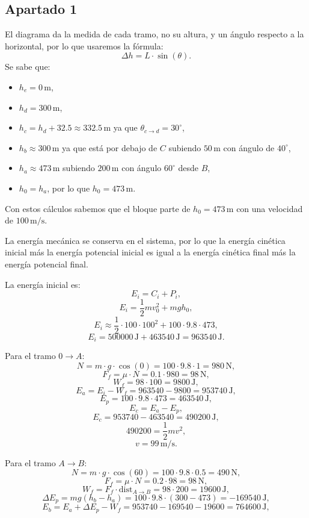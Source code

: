 \documentclass[a4paper,12pt]{article} %
\begin{document}
\subsection*{Apartado 1}
El diagrama da la medida de cada tramo, no su altura, y un ángulo respecto a la horizontal, por lo que usaremos la fórmula:
\[
\Delta h = L \cdot \sin(\theta).
\]
Se sabe que:
\begin{itemize}
    \item $h_e = 0\,\mathrm{m}$,
    \item $h_d = 300\,\mathrm{m}$,
    \item $h_c = h_d + 32.5 \approx 332.5\,\mathrm{m}$ ya que $\theta_{c \to d} = 30^\circ$,
    \item $h_b \approx 300\,\mathrm{m}$ ya que está por debajo de $C$ subiendo $50\,\mathrm{m}$ con ángulo de $40^\circ$,
    \item $h_a \approx 473\,\mathrm{m}$ subiendo $200\,\mathrm{m}$ con ángulo $60^\circ$ desde $B$,
    \item $h_0 = h_a$, por lo que $h_0 = 473\,\mathrm{m}$.
\end{itemize}

Con estos cálculos sabemos que el bloque parte de $h_0 = 473\,\mathrm{m}$ con una velocidad de $100\,\mathrm{m/s}$.

La energía mecánica se conserva en el sistema, por lo que la energía cinética inicial más la energía potencial inicial es igual a la energía cinética final más la energía potencial final.

La energía inicial es:
\[
E_i = C_i + P_i,
\]
\[
E_i = \frac{1}{2} m v_0^2 + m g h_0,
\]
\[
E_i \approx \frac{1}{2} \cdot 100 \cdot 100^2 + 100 \cdot 9.8 \cdot 473,
\]
\[
E_i = 500000\,\mathrm{J} + 463540\,\mathrm{J} = 963540\,\mathrm{J}.
\]

Para el tramo $0 \to A$:
\[
N = m \cdot g \cdot \cos(0) = 100 \cdot 9.8 \cdot 1 = 980\,\mathrm{N},
\]
\[
F_f = \mu \cdot N = 0.1 \cdot 980 = 98\,\mathrm{N},
\]
\[
W_f = 98 \cdot 100 = 9800\,\mathrm{J},
\]
\[
E_a = E_i - W_f = 963540 - 9800 = 953740\,\mathrm{J},
\]
\[
E_p = 100 \cdot 9.8 \cdot 473 = 463540\,\mathrm{J},
\]
\[
E_c = E_a - E_p,
\]
\[
E_c = 953740 - 463540 = 490200\,\mathrm{J},
\]
\[
490200 = \frac{1}{2} m v^2,
\]
\[
v = 99\,\mathrm{m/s}.
\]

Para el tramo $A \to B$:
\[
N = m \cdot g \cdot \cos(60) = 100 \cdot 9.8 \cdot 0.5 = 490\,\mathrm{N},
\]
\[
F_f = \mu \cdot N = 0.2 \cdot 98 = 98\,\mathrm{N},
\]
\[
W_f = F_f \cdot \text{dist}_{A \to B} = 98 \cdot 200 = 19600\,\mathrm{J},
\]
\[
\Delta E_p = m g (h_b - h_a) = 100 \cdot 9.8 \cdot (300 - 473) = -169540\,\mathrm{J},
\]
\[
E_b = E_a + \Delta E_p - W_f = 953740 - 169540 - 19600 = 764600\,\mathrm{J},
\]
\end{document}
